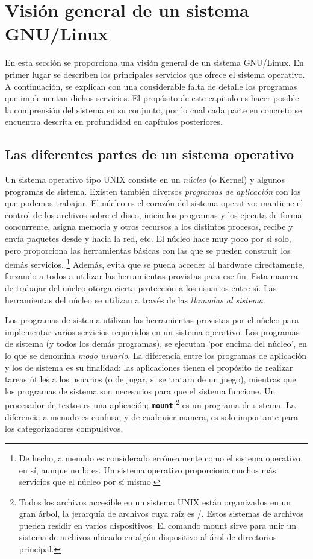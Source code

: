 \documentclass[12pt]{article}
\begin{document}
\section{Visión general de un sistema GNU/Linux}

En esta sección se proporciona una visión
general de un sistema GNU/Linux. En primer lugar se describen los principales
servicios que ofrece el sistema operativo. A continuación, se explican con una
considerable falta de detalle los programas que implementan dichos servicios. El
propósito de este capítulo es hacer posible la comprensión del sistema en su
conjunto, por lo cual cada parte en concreto se encuentra descrita en
profundidad en capítulos posteriores.  


\subsection{Las diferentes partes de un sistema operativo}

Un sistema operativo tipo UNIX consiste en un
\textit{núcleo} (o Kernel) y algunos programas de sistema. Existen
también diversos \textit{programas de aplicación} con los que
podemos trabajar.  El núcleo es el corazón del sistema operativo: mantiene el
control de los archivos sobre el disco, inicia los programas y los ejecuta de
forma concurrente, asigna memoria y otros recursos a los distintos procesos,
recibe y envía paquetes desde y hacia la red, etc. El núcleo hace muy poco por
si solo, pero proporciona las herramientas básicas con las que se pueden
construir los demás servicios.
\footnote{De hecho, a menudo es considerado erróneamente como el sistema
operativo en sí, aunque no lo es. Un sistema operativo proporciona muchos más
servicios que el núcleo	por sí mismo.}
Además, evita que se pueda acceder al hardware
directamente, forzando a todos a utilizar las herramientas provistas para ese fin. Esta
manera de trabajar del núcleo otorga cierta protección a los usuarios entre sí.
Las herramientas del núcleo se utilizan a través de las \textit{llamadas al sistema}. 

 Los programas de sistema utilizan las herramientas provistas por el
núcleo para implementar varios servicios requeridos en un sistema operativo. Los
programas de sistema (y todos los demás programas), se ejecutan 'por encima del
núcleo', en lo que se denomina \textit{modo usuario}. La diferencia entre los programas
de aplicación y los de sistema es su finalidad: las aplicaciones tienen el
propósito de realizar tareas útiles a los usuarios (o de jugar, si se tratara de
un juego), mientras que los programas de sistema son necesarios para que el
sistema funcione. Un procesador de textos es una aplicación;
\texttt{\textbf{mount}}
\footnote{
Todos los archivos accesible en un sistema UNIX están organizados en un gran 
árbol, la jerarquía de archivos cuya raíz es /. Estos sistemas de archivos 
pueden residir en varios dispositivos. El comando mount sirve para unir un 
sistema de archivos ubicado en algún dispositivo al árol de directorios principal. 
}
es un programa de sistema. La diferencia a menudo es
confusa, y de cualquier manera, es solo importante para los categorizadores
compulsivos.  
\end{document}
